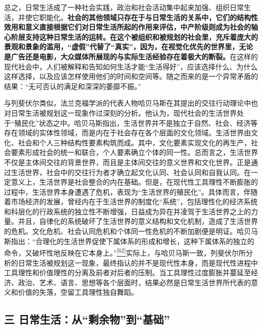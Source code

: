 \documentclass[UTF8, fontset = sourcesans, a4paper, oneside, zihao =
-4, scheme=chinese, no-math, space=true]{ctexbook}
\begin{document}
总之，日常生活成了一种社会实践，政治和社会活动集中起来加强、组织日常生活，并使它职能化。\textbf{社会的其他领域只存在于与日常生活的关系中，它们的结构性效用和意义直接根据它们对日常生活所起的作用来评估，中产阶级则成为社会的轴心阶层支持这种日常生活的运转。在这个被组织和被规划的社会里，充斥着庞大的景观和景象的滥用，``虚假''代替了``真实''，因为，在视觉化优先的世界里，无论是广告还是电影，大众媒体所展现的与实际生活经验存在着极大的断裂。}在这样的现代社会中，人们被解释和告知如何生活才能``生活得好''，应该选择什么、为什么这样选择，以及应该怎样使用他们的时间和空间等。随之而来的是一个异常矛盾的结果：``无可否认的满足和深深的萎靡不振。''

与列斐伏尔类似，法兰克福学派的代表人物哈贝马斯在其提出的交往行动理论中也对日常生活被规划这一现象作过深刻的分析。他认为，现代社会的生活世界处于``殖民化''状态之中。哈贝马斯指出，生活世界并不是独立于自然、社会、经济等存在领域的实体性领域，而是内在于社会存在各个层面的文化领域。生活世界由文化、社会和个人三种结构性要素构筑而成。其中，文化要素实现文化的再生产，社会要素形成社会的统一和联合，个人要素确立个体的同一性。总而言之，生活世界不仅是主体间交往的背景世界，而且是主体间交往的意义世界和文化世界。正是通过生活世界，社会中的交往行为者才确立起文化认同、社会认同和自我认同。在一定意义上，生活世界是社会整合的内在基础。但是，在现代性工具理性不断膨胀的过程中，生活世界本身遭遇了危机，表现为``生活世界的殖民化''。具体而言，伴随着市场经济的发展，曾经内在于生活世界的制度化``系统''，包括理性化的经济系统和科层化的行政系统的独立性不断增强，日益成为异在并凌驾于生活世界之上的力量。并且，自律化的系统破坏了生活世界的意义结构和文化机制，造成了生活世界的危机。文化危机、社会认同危机和个体同一性危机的不断加剧便是明证。哈贝马斯指出：``合理化的生活世界促使下属体系的形成和增长，这种下属体系的独立的命令，又破坏性地反映在它本身上。''\protect\hypertarget{part0007_split_004.htmlux5cux23w62}{}{}\protect\hyperlink{part0007_split_004.htmlux5cux23m62}{\textsuperscript{{[}62{]}}}实际上，与哈贝马斯一致，列斐伏尔所分析的日常生活被规划这一现象，最终指认的并不是现代性本身，而是现代性进程中工具理性和价值理性的分离及前者对后者的压制。当工具理性过度膨胀并蔓延至经济、政治、艺术、语言、思想等各个层面时，结果必然是日常生活世界所代表的意义和价值的失落，空留工具理性独自舞蹈。

\subsection{\texorpdfstring{三
日常生活：从``剩余物''到``基础''}{三 日常生活：从剩余物到基础}}\label{part0007_split_004.htmlux5cux23c035}
\end{document}
